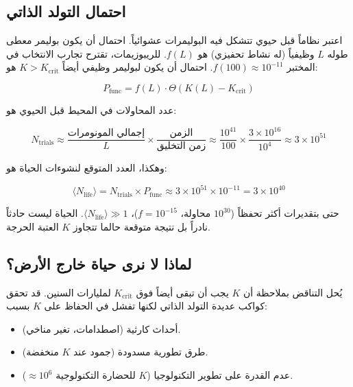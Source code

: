 \documentclass[11pt,a4paper]{article}
\newcommand{\Keffcrit}{K_{\mathrm{crit}}}
\newcommand{\Ntrials}{N_{\mathrm{trials}}}
\newcommand{\Nlife}{\langle N_{\mathrm{life}}\rangle}
\begin{document}
	\subsection{احتمال التولد الذاتي}
	
	اعتبر نظاماً قبل حيوي تتشكل فيه البوليمرات عشوائياً. احتمال أن يكون بوليمر معطى طوله \(L\) وظيفياً (له نشاط تحفيزي) هو \(f(L)\). للريبوزيمات، تقترح تجارب الانتخاب في المختبر \(f(100) \approx 10^{-11}\). احتمال أن يكون لبوليمر وظيفي أيضاً \(K > K_{\text{crit}}\) هو:
	
	\begin{equation}
		P_{\text{func}} = f(L) \cdot \Theta(K(L) - K_{\text{crit}})
		\label{eq:Pfunc}
	\end{equation}
	
	عدد المحاولات في المحيط قبل الحيوي هو:
	
	\begin{equation}
		\Ntrials \approx \frac{\text{إجمالي المونومرات}}{L} \times \frac{\text{الزمن}}{\text{زمن التخليق}} \approx \frac{10^{41}}{100} \times \frac{3\times 10^{16}}{10^4} \approx 3 \times 10^{51}
		\label{eq:trials}
	\end{equation}
	
	وهكذا، العدد المتوقع لنشوءات الحياة هو:
	
	\begin{equation}
		\Nlife = \Ntrials \times P_{\text{func}} \approx 3 \times 10^{51} \times 10^{-11} = 3 \times 10^{40}
		\label{eq:Nlife}
	\end{equation}
	
	حتى بتقديرات أكثر تحفظاً (\(10^{30}\) محاولة، \(f=10^{-15}\))، \(\Nlife \gg 1\). الحياة ليست حادثاً نادراً بل نتيجة متوقعة حالما تتجاوز \(K\) العتبة الحرجة.
	
	\subsection{لماذا لا نرى حياة خارج الأرض؟}
	
	يُحل التناقض بملاحظة أن \(K\) يجب أن تبقى أيضاً فوق \(\Keffcrit\) لمليارات السنين. قد تحقق كواكب عديدة التولد الذاتي لكنها تفشل في الحفاظ على \(K\) بسبب:
	
	\begin{itemize}
		\item أحداث كارثية (اصطدامات، تغير مناخي).
		\item طرق تطورية مسدودة (جمود عند \(K\) منخفضة).
		\item عدم القدرة على تطوير التكنولوجيا (\(K\) للحضارة التكنولوجية \(\approx 10^6\)).
	\end{itemize}
	
\end{document}
